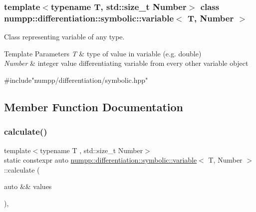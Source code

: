\subsubsection*{template$<$typename T, std\+::size\+\_\+t Number$>$\newline
class numpp\+::differentiation\+::symbolic\+::variable$<$ T, Number $>$}

Class representing variable of any type. 


\begin{DoxyTemplParams}{Template Parameters}
{\em T} & type of value in variable (e.\+g. double) \\
\hline
{\em Number} & integer value differentiating variable from every other variable object\\
\hline
\end{DoxyTemplParams}

\begin{DoxyCode}
\textcolor{preprocessor}{#include"numpp/differentiation/symbolic.hpp"}
\end{DoxyCode}
 

\subsection{Member Function Documentation}
\mbox{\label{classnumpp_1_1differentiation_1_1symbolic_1_1variable_ad73b5d668d3bcf9802a0464ea3389ac6}} 
\subsubsection{\texorpdfstring{calculate()}{calculate()}}
{\footnotesize\ttfamily template$<$typename T , std\+::size\+\_\+t Number$>$ \\
static constexpr auto \hyperlink{classnumpp_1_1differentiation_1_1symbolic_1_1variable}{numpp\+::differentiation\+::symbolic\+::variable}$<$ T, Number $>$\+::calculate (\begin{DoxyParamCaption}\item[{auto \&\&}]{values }\end{DoxyParamCaption})\hspace{0.3cm}{\ttfamily [inline]}, {\ttfamily [static]}}



